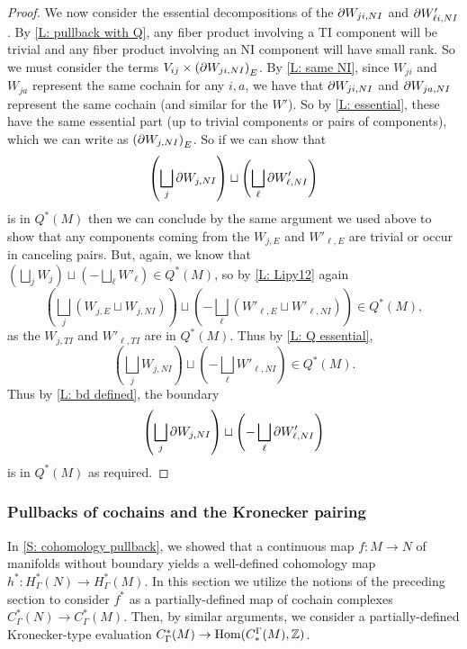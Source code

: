 \begin{proof}
We now consider the essential decompositions of the $\partial W_{ji,NI}$ and $\partial W'_{\ell i,NI}$. By \cref{L: pullback with Q}, any fiber product involving a TI component will be trivial and any fiber product involving an NI component will have small rank. So we must consider the terms $V_{ij} \times \left(\partial W_{ji,NI}\right)_E$. By \cref{L: same NI}, since $W_{ji}$ and $W_{ja}$ represent the same cochain for any $i,a$, we have that $\partial W_{ji,NI}$ and $\partial W_{ja,NI}$ represent the same cochain (and similar for the $W'$). So by \cref{L: essential}, these have the same essential part (up to trivial components or pairs of components), which we can write as $\left(\partial W_{j,NI}\right)_E$. So if we can show that
$$\left(\bigsqcup_j \partial W_{j,NI}\right)\sqcup \left(\bigsqcup_\ell \partial W'_{\ell,NI}\right)$$
is in $Q^*(M)$ then we can conclude by the same argument we used above to show that any components coming from the $W_{j,E}$ and $W'_{\ell,E}$ are trivial or occur in canceling pairs. But, again, we know that
 $(\bigsqcup_j W_{j})\sqcup (-\bigsqcup_\ell W'_{\ell}) \in Q^*(M)$, so by \cref{L: Lipy12} again
$$\left(\bigsqcup_j \left(W_{j,E}\sqcup W_{j,NI}\right)\right)\sqcup \left(-\bigsqcup_\ell \left(W'_{\ell,E}\sqcup W'_{\ell,NI}\right)\right) \in Q^*(M),$$
as the $W_{j,TI}$ and $W'_{\ell, TI}$ are in $Q^*(M)$.
Thus by \cref{L: Q essential}, $$\left(\bigsqcup_j W_{j,NI}\right)\sqcup \left(-\bigsqcup_\ell W'_{\ell,NI}\right) \in Q^*(M).$$ Thus by \cref{L: bd defined}, the boundary
$$\left(\bigsqcup_j \partial W_{j,NI}\right)\sqcup \left(-\bigsqcup_\ell \partial W'_{\ell,NI}\right)$$ is in $Q^*(M)$
as required.
\end{proof}







\subsubsection{Pullbacks of cochains and the Kronecker pairing}

In \cref{S: cohomology pullback}, we showed that a continuous map $f \colon M \to N$ of manifolds without boundary yields a well-defined cohomology map $h^*:H^*_\Gamma(N) \to H^*_\Gamma(M)$. In this section we utilize the notions of the preceding section to consider $f^*$ as a partially-defined map of cochain complexes $C^*_\Gamma(N) \to C^*_\Gamma(M)$. Then, by similar arguments, we consider a partially-defined Kronecker-type evaluation $C^*_\Gamma(M) \to \textup{Hom}(C_*^\Gamma(M),\mathbb{Z})$.

